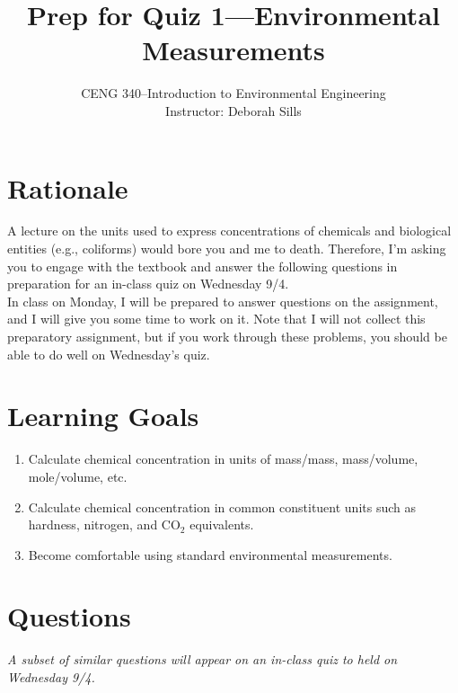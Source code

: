\documentclass[12pt,letterpaper]{article}
\begin{document}
\setlength{\parindent}{0cm} 


\frenchspacing

\title {Prep for Quiz 1---Environmental Measurements} 
\author {CENG 340--Introduction to Environmental Engineering\\
Instructor: Deborah Sills}
\maketitle

\section *{Rationale}
A lecture on the units used to express concentrations of chemicals and biological entities (e.g., coliforms) would bore you and me to death. Therefore, I'm asking you to engage with the textbook and answer the following questions in preparation for an in-class quiz on Wednesday 9/4.\\

In class on Monday, I will be prepared to answer questions on the assignment, and I will give you some time to work on it. Note that I will not collect this preparatory assignment, but if you work through these problems, you should be able to do well on Wednesday's quiz.

\section *{Learning Goals}
\begin{enumerate}
\item Calculate chemical concentration in units of mass/mass, mass/volume, mole/volume, etc.
\item Calculate chemical concentration in common constituent units such as hardness, nitrogen, and CO$_2$ equivalents. 
\item Become comfortable using standard environmental measurements.
\end{enumerate}

\section *{Questions}
\emph{A subset of similar questions will appear on an in-class quiz to held on Wednesday 9/4.}
\end{document}
